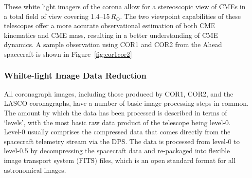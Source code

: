 These white light imagers of the corona allow for a stereoscopic view of CMEs in a total field of view covering 1.4--15\,$R_{\odot}$. The two viewpoint capabilities of these telescopes offer a more accurate observational estimation of both CME kinematics and CME mass, resulting in a better understanding of CME dynamics. A sample observation using COR1 and COR2 from the Ahead spacecraft is shown in Figure~\ref{fig:cor1cor2}


\subsubsection{Whilte-light Image Data Reduction}

All coronagraph images, including those produced by COR1, COR2, and the LASCO coronagraphs, have a number of basic image processing steps in common. The amount by which the data has been processed is described in terms of `levels', with the most basic raw data product of the telescope being level-0. Level-0 usually comprises the compressed data that comes directly from the spacecraft telemetry stream via the DPS. The data is processed from level-0 to level-0.5 by decompressing the spacecraft data and re-packaged into flexible image transport system (FITS) files, which is an open standard format for all astronomical images. 

